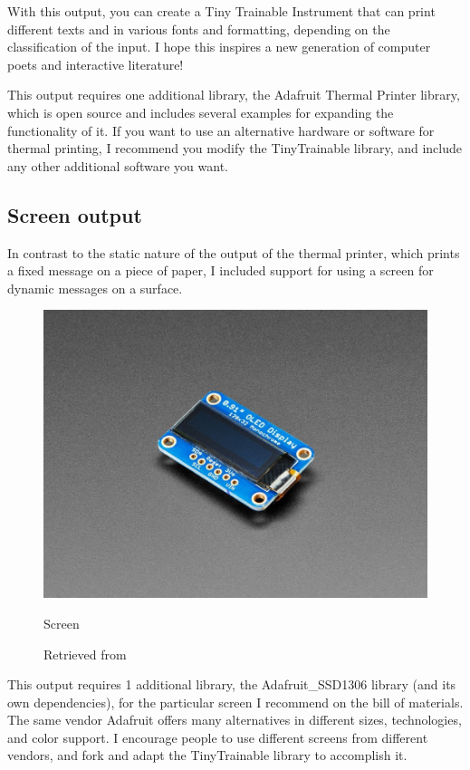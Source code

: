 With this output, you can create a Tiny Trainable Instrument that can print different texts and in various fonts and formatting, depending on the classification of the input. I hope this inspires a new generation of computer poets and interactive literature!

This output requires one additional library, the Adafruit Thermal Printer library, which is open source and includes several examples for expanding the functionality of it. If you want to use an alternative hardware or software for thermal printing, I recommend you modify the TinyTrainable library, and include any other additional software you want.

\subsection{Screen output}

In contrast to the static nature of the output of the thermal printer, which prints a fixed message on a piece of paper, I included support for using a screen for dynamic messages on a surface. 

\begin{figure}[ht]
  \centering
  \includegraphics[width=0.75\linewidth,height=0.25\textheight,keepaspectratio]{images/materials-adafruit-screen.jpg}
  \caption{Screen}
  \caption*{Retrieved from \cite{website-materials-adafruit-screen}}
  \label{fig:materials-adafruit-screen}
\end{figure}

This output requires 1 additional library, the Adafruit{\_}SSD1306 library (and its own dependencies), for the particular screen I recommend on the bill of materials. The same vendor Adafruit offers many alternatives in different sizes, technologies, and color support. I encourage people to use different screens from different vendors, and \gls{fork} and adapt the TinyTrainable library to accomplish it.

